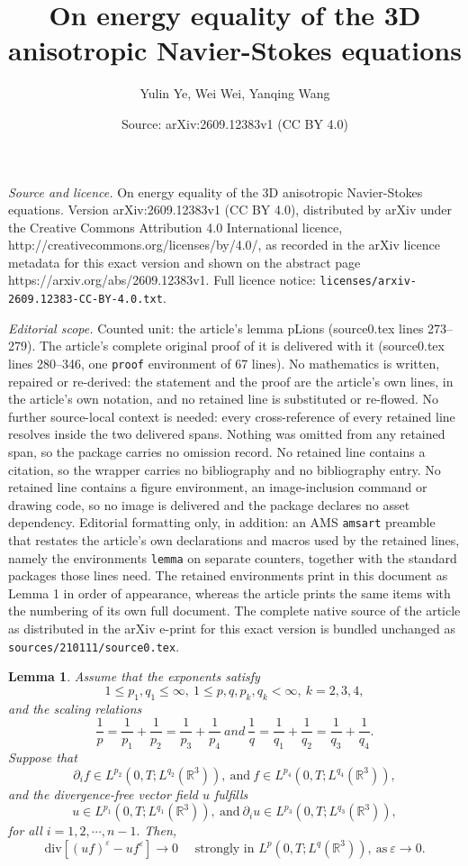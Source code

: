 \documentclass[10pt,a4paper]{amsart}
\title{On energy equality of the 3D anisotropic Navier-Stokes equations}
\author{Yulin Ye, Wei Wei, Yanqing Wang}
\date{Source: arXiv:2609.12383v1 (CC BY 4.0)}
\newtheorem{lemma}{Lemma}
\newcommand{\s}{\mathrm{div}}
\begin{document}
\maketitle

\noindent\emph{Source and licence.} On energy equality of the 3D anisotropic Navier-Stokes equations. Version arXiv:2609.12383v1 (CC BY 4.0), distributed by arXiv under the Creative Commons Attribution 4.0 International licence, http://creativecommons.org/licenses/by/4.0/, as recorded in the arXiv licence metadata for this exact version and shown on the abstract page https://arxiv.org/abs/2609.12383v1. Full licence notice: \texttt{licenses/arxiv-2609.12383-CC-BY-4.0.txt}.\par\smallskip

\noindent\textit{Editorial scope.} Counted unit: the article's lemma pLions (source0.tex lines 273--279). The article's complete original proof of it is delivered with it (source0.tex lines 280--346, one \texttt{proof} environment of 67 lines). No mathematics is written, repaired or re-derived: the statement and the proof are the article's own lines, in the article's own notation, and no retained line is substituted or re-flowed.  No further source-local context is needed: every cross-reference of every retained line resolves inside the two delivered spans.  Nothing was omitted from any retained span, so the package carries no omission record.  No retained line contains a citation, so the wrapper carries no bibliography and no bibliography entry.  No retained line contains a figure environment, an image-inclusion command or drawing code, so no image is delivered and the package declares no asset dependency.  Editorial formatting only, in addition: an AMS \texttt{amsart} preamble that restates the article's own declarations and macros used by the retained lines, namely the environments \texttt{lemma} on separate counters, together with the standard packages those lines need.  The retained environments print in this document as Lemma 1 in order of appearance, whereas the article prints the same items with the numbering of its own full document.  The complete native source of the article as distributed in the arXiv e-print for this exact version is bundled unchanged as \texttt{sources/210111/source0.tex}.
\begin{lemma}
	\label{pLions}  Assume that the exponents satisfy $$1\leq p_1,q_1\leq \infty,~1\leq p, q, p_k, q_k< \infty,~k=2,3,4,$$ and the scaling relations $$\frac{1}{p}=\frac{1}{p_1}+\frac{1}{p_2}=\frac{1}{p_3}+\frac{1}{p_4}~ and ~ \frac{1}{q}=\frac{1}{q_1}+\frac{1}{q_2}=\frac{1}{q_3}+\frac{1}{q_4}.$$ Suppose that $$\partial_{i}f\in L^{p_2}(0,T;L^{q_2}(\mathbb{R}^3)), ~\text{and}~f\in L^{p_4}(0,T;L^{q_4}(\mathbb{R}^3)),$$
	and the divergence-free vector field $u$ fulfills
	 $$  u\in L^{p_1}(0,T;L^{q_1}(\mathbb{R}^3)),~\text{and}~\partial_{i} u\in L^{p_3}(0,T;L^{q_3}(\mathbb{R}^3)),$$
	 for all $i=1, 2,\cdots,n-1.$
Then,  $$  \s[(uf)^\varepsilon  -   u  f^\varepsilon   ]\to 0\quad\text{ strongly~in } {L^{p}(0,T;L^{q}(\mathbb{R}^3))},~\text{as}~\varepsilon\to 0.$$
\end{lemma}
\end{document}
